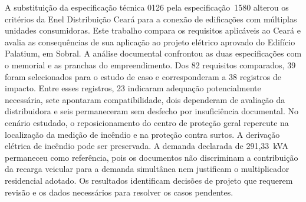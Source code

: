 A substituição da especificação técnica 0126 pela especificação~1580 alterou os critérios da Enel Distribuição Ceará para a conexão de edificações com múltiplas unidades consumidoras. Este trabalho compara os requisitos aplicáveis ao Ceará e avalia as consequências de sua aplicação ao projeto elétrico aprovado do Edifício Palatium, em Sobral. A análise documental confrontou as duas especificações com o memorial e as pranchas do empreendimento. Dos 82 requisitos comparados, 39 foram selecionados para o estudo de caso e corresponderam a 38 registros de impacto. Entre esses registros, 23 indicaram adequação potencialmente necessária, sete apontaram compatibilidade, dois dependeram de avaliação da distribuidora e seis permaneceram sem desfecho por insuficiência documental. No cenário estudado, o reposicionamento do centro de proteção geral repercute na localização da medição de incêndio e na proteção contra surtos. A derivação elétrica de incêndio pode ser preservada. A demanda declarada de 291,33~kVA permaneceu como referência, pois os documentos não discriminam a contribuição da recarga veicular para a demanda simultânea nem justificam o multiplicador residencial adotado. Os resultados identificam decisões de projeto que requerem revisão e os dados necessários para resolver os casos pendentes.

